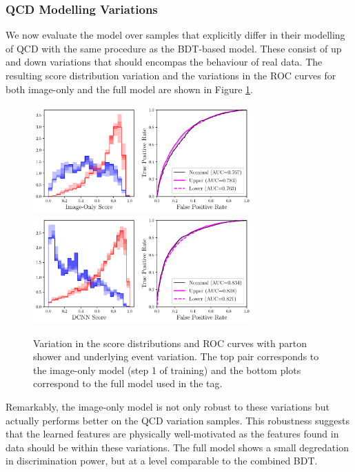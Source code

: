 \subsubsection{QCD Modelling Variations}
We now evaluate the model over samples that explicitly differ in their modelling of QCD with the same procedure as the BDT-based model.
These consist of up and down variations that should encompas the behaviour of real data.
The resulting score distribution variation and the variations in the ROC curves for both image-only and the full model are shown in Figure \ref{fig:event_categorisation:DCNN_psvar}.
\begin{figure}[h!]
    \centering
    \includegraphics[width=0.75\textwidth]{figures/event_selection/imgonly_PSvar_PS.pdf}
    \includegraphics[width=0.75\textwidth]{figures/event_selection/int_PSvar_PS.pdf}
    \caption{Variation in the score distributions and ROC curves with parton shower and underlying event variation. The top pair corresponds to the image-only model (step 1 of training) and the bottom plots correspond to the full model used in the tag.}
    \label{fig:event_categorisation:DCNN_psvar}
\end{figure}

Remarkably, the image-only model is not only robust to these variations but actually performs better on the QCD variation samples.
This robustness suggests that the learned features are physically well-motivated as the features found in data should be within these variations.
The full model shows a small degredation in discrimination power, but at a level comparable to the combined BDT. 

